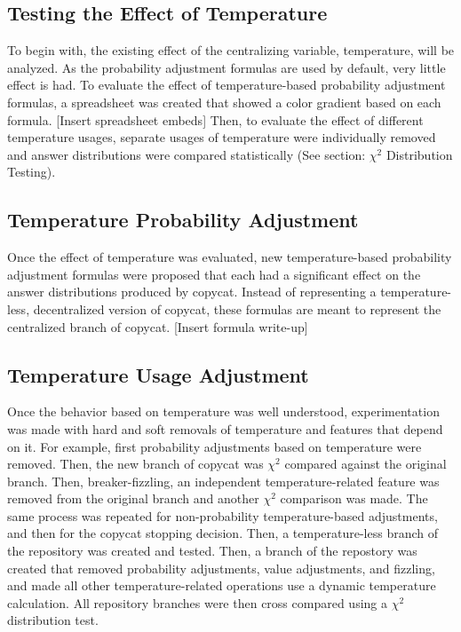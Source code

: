 \documentclass[a4paper]{article}
\begin{document}
    \subsection{Testing the Effect of Temperature}

        To begin with, the existing effect of the centralizing variable, temperature, will be analyzed.
        As the probability adjustment formulas are used by default, very little effect is had.
        To evaluate the effect of temperature-based probability adjustment formulas, a spreadsheet was created that showed a color gradient based on each formula.
        [Insert spreadsheet embeds]
        Then, to evaluate the effect of different temperature usages, separate usages of temperature were individually removed and answer distributions were compared statistically (See section: $\chi^2$ Distribution Testing).

    \subsection{Temperature Probability Adjustment}

        Once the effect of temperature was evaluated, new temperature-based probability adjustment formulas were proposed that each had a significant effect on the answer distributions produced by copycat.
        Instead of representing a temperature-less, decentralized version of copycat, these formulas are meant to represent the centralized branch of copycat.
        [Insert formula write-up]

    \subsection{Temperature Usage Adjustment}

        Once the behavior based on temperature was well understood, experimentation was made with hard and soft removals of temperature and features that depend on it.
        For example, first probability adjustments based on temperature were removed.
        Then, the new branch of copycat was $\chi^2$ compared against the original branch.
        Then, breaker-fizzling, an independent temperature-related feature was removed from the original branch and another $\chi^2$ comparison was made.
        The same process was repeated for non-probability temperature-based adjustments, and then for the copycat stopping decision.
        Then, a temperature-less branch of the repository was created and tested.
        Then, a branch of the repostory was created that removed probability adjustments, value adjustments, and fizzling, and made all other temperature-related operations use a dynamic temperature calculation.
        All repository branches were then cross compared using a $\chi^2$ distribution test.
\end{document}
